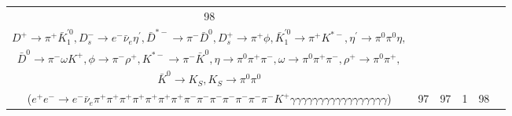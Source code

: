 \documentclass[landscape]{article}
\begin{document}
\begin{table}[htbp!]
\begin{tabular}{|c|c|c|c|c|c|}
\hline
98 & \makecell{ $ 
e^{+} e^{-} \rightarrow \Upsilon(4S) ,
\Upsilon(4S) \rightarrow B^{0} \bar{B}^{0} ,
B^{0} \rightarrow D_{2}^{*-} D_{s}^{*+} ,
\bar{B}^{0} \rightarrow \pi^{+} \pi^{-} D^{+} D_{s}^{-} ,
D_{2}^{*-} \rightarrow \pi^{0} \bar{D}^{*-} ,
D_{s}^{*+} \rightarrow D_{s}^{+} \gamma ,
$ \\ $
D^{+} \rightarrow \pi^{+} \bar{K}_1^{'0} ,
D_{s}^{-} \rightarrow e^{-} \bar{\nu}_{e} \eta^{\prime} ,
\bar{D}^{*-} \rightarrow \pi^{-} \bar{D}^{0} ,
D_{s}^{+} \rightarrow \pi^{+} \phi ,
\bar{K}_1^{'0} \rightarrow \pi^{+} K^{*-} ,
\eta^{\prime} \rightarrow \pi^{0} \pi^{0} \eta ,
$ \\ $
\bar{D}^{0} \rightarrow \pi^{-} \omega K^{+} ,
\phi \rightarrow \pi^{-} \rho^{+} ,
K^{*-} \rightarrow \pi^{-} \bar{K}^{0} ,
\eta \rightarrow \pi^{0} \pi^{+} \pi^{-} ,
\omega \rightarrow \pi^{0} \pi^{+} \pi^{-} ,
\rho^{+} \rightarrow \pi^{0} \pi^{+} ,
$ \\ $
\bar{K}^{0} \rightarrow K_{S} ,
K_{S} \rightarrow \pi^{0} \pi^{0} 
$ \\ ($
e^{+} e^{-} \rightarrow e^{-} \bar{\nu}_{e} \pi^{+} \pi^{+} \pi^{+} \pi^{+} \pi^{+} \pi^{+} \pi^{+} \pi^{-} \pi^{-} \pi^{-} \pi^{-} \pi^{-} \pi^{-} \pi^{-} K^{+} \gamma \gamma \gamma \gamma \gamma \gamma \gamma \gamma \gamma \gamma \gamma \gamma \gamma \gamma \gamma \gamma \gamma 
$) } & 97 & 97 & 1 & 98 \\
\hline
\end{tabular}
\end{table}

\clearpage
\end{document}

